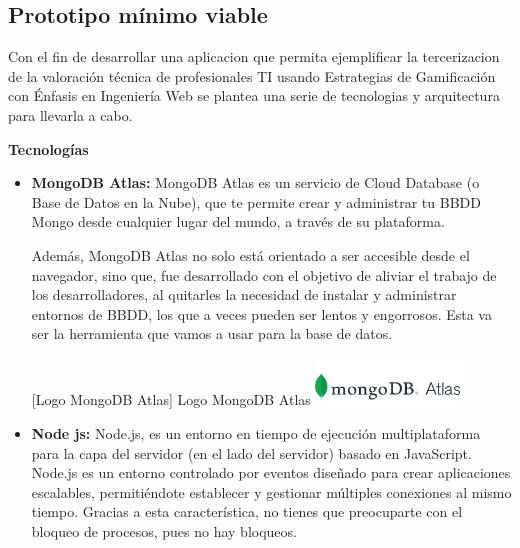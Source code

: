 \subsection{Prototipo mínimo viable}
Con el fin de desarrollar una aplicacion que permita ejemplificar la tercerizacion de la valoración técnica de profesionales TI usando Estrategias de Gamificación con Énfasis en Ingeniería Web se plantea una serie de tecnologias y arquitectura para llevarla a cabo.

\newline

\textbf{Tecnologías}

\begin{itemize}
    
    \item \textbf{MongoDB Atlas: } MongoDB Atlas es un servicio de Cloud Database (o Base de Datos en la Nube), que te permite crear y administrar tu BBDD Mongo desde cualquier lugar del mundo, a través de su plataforma. 
    
    Además, MongoDB Atlas no solo está orientado a ser accesible desde el navegador, sino que, fue desarrollado con el objetivo de aliviar el trabajo de los desarrolladores, al quitarles la necesidad de instalar y administrar entornos de BBDD, los que a veces pueden ser lentos y engorrosos. Esta va ser la herramienta que vamos a usar para la base de datos.
   
    \vspace{2mm}
        \begin{minipage}{0.9\textwidth}
        \centering
        [{Logo MongoDB Atlas}]{ Logo MongoDB Atlas  }
        \label{mongoDB}
         \includegraphics[width=0.3\textwidth]{Images/mongodb-atlas.png}
    \end{minipage}

    \item \textbf{Node js: }  Node.js, es un entorno en tiempo de ejecución multiplataforma para la capa del servidor (en el lado del servidor) basado en JavaScript. Node.js es un entorno controlado por eventos diseñado para crear aplicaciones escalables, permitiéndote establecer y gestionar múltiples conexiones al mismo tiempo. Gracias a esta característica, no tienes que preocuparte con el bloqueo de procesos, pues no hay bloqueos.
   

\end{itemize}
